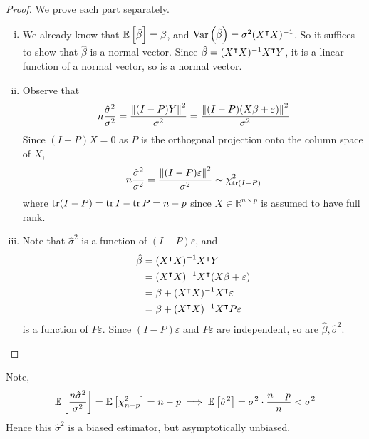 \begin{proof}
	We prove each part separately.
	\begin{enumerate}[(i)]
		\item We already know that \( \mathbb{E}\left[{\hat \beta}\right] = \beta \), and \( \operatorname{Var}\left({\hat \beta}\right) = \sigma^2 (X^\intercal X)^{-1} \).
			So it suffices to show that \( \hat \beta \) is a normal vector.
			Since \( \hat \beta = (X^\intercal X)^{-1} X^\intercal Y \), it is a linear function of a normal vector, so is a normal vector.
		\item Observe that
			\[ n\frac{\hat\sigma^2}{\sigma^2} = \frac{\norm{(I-P)Y}^2}{\sigma^2} = \frac{\norm{(I-P)(X\beta+\varepsilon)}^2}{\sigma^2} \]
			Since \( (I-P)X = 0 \) as \( P \) is the orthogonal projection onto the column space of \( X \),
			\[ n\frac{\hat\sigma^2}{\sigma^2} = \frac{\norm{(I-P)\varepsilon}^2}{\sigma^2} \sim \chi^2_{\tr (I-P)} \]
			where \( \tr (I-P) = \tr I - \tr P = n - p \) since \( X \in \mathbb R^{n \times p} \) is assumed to have full rank.
		\item Note that \( \hat \sigma^2 \) is a function of \( (I-P)\varepsilon \), and
			\begin{align*}
				\hat\beta &= (X^\intercal X)^{-1} X^\intercal Y \\
				&= (X^\intercal X)^{-1} X^\intercal (X\beta+\varepsilon) \\
				&= \beta + (X^\intercal X)^{-1} X^\intercal \varepsilon \\
				&= \beta + (X^\intercal X)^{-1} X^\intercal P\varepsilon
			\end{align*}
			is a function of \( P\varepsilon \).
			Since \( (I-P)\varepsilon \) and \( P \varepsilon \) are independent, so are \( \hat \beta, \hat \sigma^2 \).
	\end{enumerate}
\end{proof}
Note,
\[ \mathbb{E}\left[{\frac{n\hat\sigma^2}{\sigma^2}}\right] = \mathbb{E}\left[{\chi^2_{n-p}}\right] = n-p \implies \mathbb{E}\left[{\hat\sigma^2}\right] = \sigma^2 \cdot \frac{n-p}{n} < \sigma^2 \]
Hence this \( \hat \sigma^2 \) is a biased estimator, but asymptotically unbiased.

